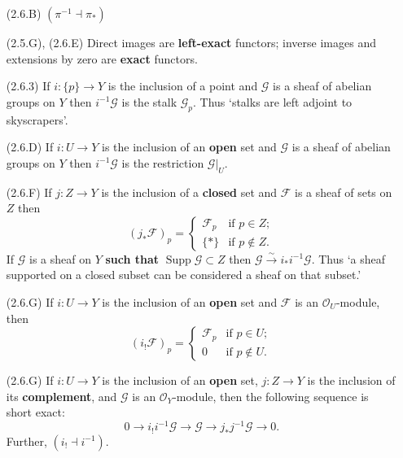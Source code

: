 \documentclass[10pt]{article}
\DeclareMathOperator{\Supp}{Supp}
\newcommand{\fsheaf}{\mathcal{F}}
\newcommand{\gsheaf}{\mathcal{G}}
\renewcommand{\O}{\mathcal{O}}
\newcommand{\congto}{\xrightarrow{\sim}}
\begin{document}
                \begin{itemize}
                    \item[(2.6.B)] $(\pi^{-1}\dashv\pi_*)$
                    \item[(2.5.G), (2.6.E)] Direct images are \textbf{left-exact} functors; inverse images and extensions by zero are \textbf{exact} functors.
                    \item[(2.6.3)] If $i\colon\{p\}\to Y$ is the inclusion of a point and $\gsheaf$ is a sheaf of abelian groups on $Y$ then $i^{-1}\gsheaf$ is the stalk $\gsheaf_p$.
                        Thus `stalks are left adjoint to skyscrapers'.
                    \item[(2.6.D)] If $i\colon U\to Y$ is the inclusion of an \textbf{open} set and $\gsheaf$ is a sheaf of abelian groups on $Y$ then $i^{-1}\gsheaf$ is the restriction $\gsheaf|_U$.
                    \item[(2.6.F)] If $j\colon Z\to Y$ is the inclusion of a \textbf{closed} set and $\fsheaf$ is a sheaf of sets on $Z$ then \[(j_*\fsheaf)_p=\begin{cases}
                            \fsheaf_p &\text{if }p\in Z;\\
                            \{*\} &\text{if }p\not\in Z.
                        \end{cases}\]
                        If $\gsheaf$ is a sheaf on $Y$ \textbf{such that} $\Supp\gsheaf\subset Z$ then $\gsheaf\congto i_*i^{-1}\gsheaf$.
                        Thus `a sheaf supported on a closed subset can be considered a sheaf on that subset.'
                    \item[(2.6.G)] If $i\colon U\to Y$ is the inclusion of an \textbf{open} set and $\fsheaf$ is an $\O_U$-module, then \[(i_!\fsheaf)_p=\begin{cases}
                            \fsheaf_p &\text{if }p\in U;\\
                            0 &\text{if }p\not\in U.
                        \end{cases}\]
                    \item[(2.6.G)] If $i\colon U\to Y$ is the inclusion of an \textbf{open} set, $j\colon Z\to Y$ is the inclusion of its \textbf{complement}, and $\gsheaf$ is an $\O_Y$-module, then the following sequence is short exact:
                        \[0 \to i_!i^{-1}\gsheaf \to \gsheaf \to j_*j^{-1}\gsheaf \to 0.\]
                        Further, $(i_!\dashv i^{-1})$.
                \end{itemize}
            
\end{document}

